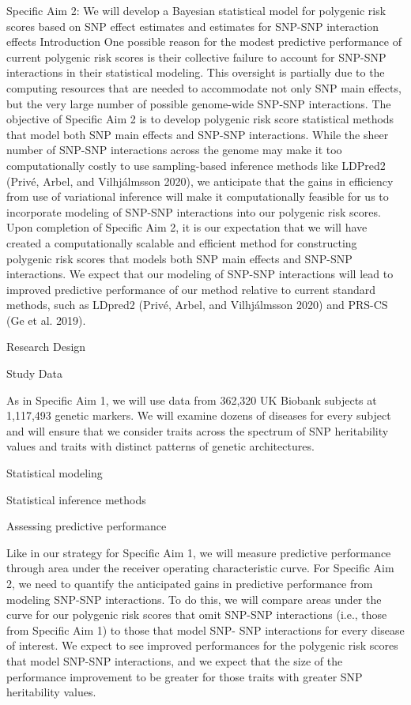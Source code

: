 \documentclass[
  11pt,
  letterpaper,
  DIV=11,
  numbers=noendperiod]{scrartcl}
\begin{document}
Specific Aim 2: We will develop a Bayesian statistical model for
polygenic risk scores based on SNP effect estimates and estimates for
SNP-SNP interaction effects Introduction One possible reason for the
modest predictive performance of current polygenic risk scores is their
collective failure to account for SNP-SNP interactions in their
statistical modeling. This oversight is partially due to the computing
resources that are needed to accommodate not only SNP main effects, but
the very large number of possible genome-wide SNP-SNP interactions. The
objective of Specific Aim 2 is to develop polygenic risk score
statistical methods that model both SNP main effects and SNP-SNP
interactions. While the sheer number of SNP-SNP interactions across the
genome may make it too computationally costly to use sampling-based
inference methods like LDPred2 (Privé, Arbel, and Vilhjálmsson 2020), we
anticipate that the gains in efficiency from use of variational
inference will make it computationally feasible for us to incorporate
modeling of SNP-SNP interactions into our polygenic risk scores. Upon
completion of Specific Aim 2, it is our expectation that we will have
created a computationally scalable and efficient method for constructing
polygenic risk scores that models both SNP main effects and SNP-SNP
interactions. We expect that our modeling of SNP-SNP interactions will
lead to improved predictive performance of our method relative to
current standard methods, such as LDpred2 (Privé, Arbel, and
Vilhjálmsson 2020) and PRS-CS (Ge et al. 2019).

Research Design

Study Data

As in Specific Aim 1, we will use data from 362,320 UK Biobank subjects
at 1,117,493 genetic markers. We will examine dozens of diseases for
every subject and will ensure that we consider traits across the
spectrum of SNP heritability values and traits with distinct patterns of
genetic architectures.

Statistical modeling

Statistical inference methods

Assessing predictive performance

Like in our strategy for Specific Aim 1, we will measure predictive
performance through area under the receiver operating characteristic
curve. For Specific Aim 2, we need to quantify the anticipated gains in
predictive performance from modeling SNP-SNP interactions. To do this,
we will compare areas under the curve for our polygenic risk scores that
omit SNP-SNP interactions (i.e., those from Specific Aim 1) to those
that model SNP- SNP interactions for every disease of interest. We
expect to see improved performances for the polygenic risk scores that
model SNP-SNP interactions, and we expect that the size of the
performance improvement to be greater for those traits with greater SNP
heritability values.
\end{document}
